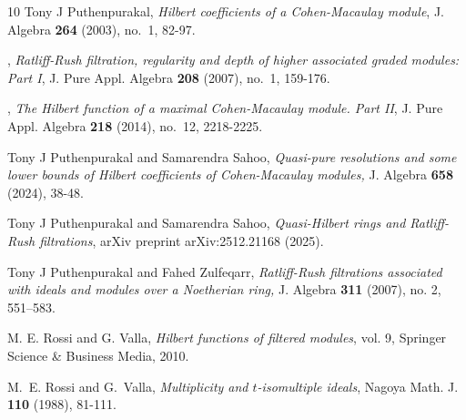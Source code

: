 \documentclass[11pt]{amsart}
\theoremstyle{plain}
\theoremstyle{plain}
\begin{document}
\begin{thebibliography}{10}
Tony J Puthenpurakal, \emph{Hilbert coefficients of a {Cohen-Macaulay} module}, J. Algebra \textbf{264} (2003), no.~1, 82-97.

\bysame, \emph{Ratliff-{Rush} filtration, regularity and depth of higher associated graded modules: Part {I}},  J. Pure Appl. Algebra \textbf{208} (2007), no.~1, 159-176.

\bysame, \emph{The {Hilbert} function of a maximal {Cohen}-{Macaulay} module. {Part II}},  J. Pure Appl. Algebra \textbf{218} (2014), no.~12,
  2218-2225.

 Tony J Puthenpurakal and Samarendra Sahoo, \emph{Quasi-pure resolutions and some lower bounds of Hilbert coefficients of Cohen-Macaulay modules,} J. Algebra
\textbf{658} (2024), 38-48.

  Tony J Puthenpurakal and Samarendra Sahoo, \emph{Quasi-Hilbert rings and Ratliff-Rush filtrations}, arXiv preprint arXiv:2512.21168 (2025).



Tony J Puthenpurakal and Fahed Zulfeqarr,
 \emph{Ratliff-Rush filtrations associated with ideals and modules over a Noetherian ring,} J. Algebra \textbf{311} (2007), no. 2, 551–583.

M. E. Rossi and G. Valla, \emph{Hilbert functions of filtered modules}, vol. 9, Springer Science \& Business Media, 2010.

M.~E. Rossi and G.~Valla, \emph{Multiplicity and {$t$}-isomultiple ideals}, Nagoya Math. J. \textbf{110} (1988), 81-111.

\end{thebibliography}
\end{document}
